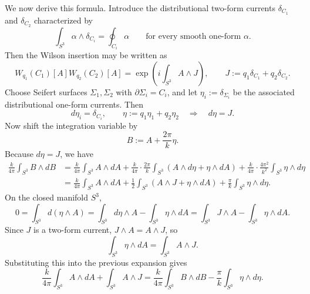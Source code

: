 \begin{example}
\noindent We now derive this formula. Introduce the distributional two-form currents $\delta_{C_1}$ and $\delta_{C_2}$ characterized by
\begin{equation*}
\int_{S^3}\alpha\wedge \delta_{C_i} = \oint_{C_i}\alpha
\qquad
\text{for every smooth one-form }\alpha.
\end{equation*}
Then the Wilson insertion may be written as
\begin{equation*}
W_{q_1}(C_1)[A]W_{q_2}(C_2)[A]
=
\exp\left(i\int_{S^3}A\wedge J\right),
\qquad
J := q_1\delta_{C_1} + q_2\delta_{C_2}.
\end{equation*}
Choose Seifert surfaces $\Sigma_1,\Sigma_2$ with $\partial \Sigma_i = C_i$, and let $\eta_i := \delta_{\Sigma_i}$ be the associated distributional one-form currents. Then
\begin{equation*}
d\eta_i = \delta_{C_i},
\qquad
\eta := q_1\eta_1 + q_2\eta_2
\quad\Longrightarrow\quad
d\eta = J.
\end{equation*}
Now shift the integration variable by
\begin{equation*}
B := A + \frac{2\pi}{k}\eta.
\end{equation*}
Because $d\eta = J$, we have
\begin{align*}
\frac{k}{4\pi}\int_{S^3} B\wedge dB
&=
\frac{k}{4\pi}\int_{S^3} A\wedge dA
+ \frac{k}{4\pi}\cdot \frac{2\pi}{k}\int_{S^3}\left(A\wedge d\eta + \eta\wedge dA\right)
+ \frac{k}{4\pi}\cdot \frac{4\pi^2}{k^2}\int_{S^3}\eta\wedge d\eta \\
&=
\frac{k}{4\pi}\int_{S^3} A\wedge dA
+ \frac{1}{2}\int_{S^3}\left(A\wedge J + \eta\wedge dA\right)
+ \frac{\pi}{k}\int_{S^3}\eta\wedge d\eta.
\end{align*}
On the closed manifold $S^3$,
\begin{equation*}
0 = \int_{S^3} d(\eta\wedge A)
= \int_{S^3} d\eta\wedge A - \int_{S^3}\eta\wedge dA
= \int_{S^3} J\wedge A - \int_{S^3}\eta\wedge dA.
\end{equation*}
Since $J$ is a two-form current, $J\wedge A = A\wedge J$, so
\begin{equation*}
\int_{S^3}\eta\wedge dA = \int_{S^3}A\wedge J.
\end{equation*}
Substituting this into the previous expansion gives
\begin{equation}\label{eq:completed-square-abelian}
\frac{k}{4\pi}\int_{S^3} A\wedge dA + \int_{S^3}A\wedge J
=
\frac{k}{4\pi}\int_{S^3} B\wedge dB - \frac{\pi}{k}\int_{S^3}\eta\wedge d\eta.
\end{equation}


\end{example}
